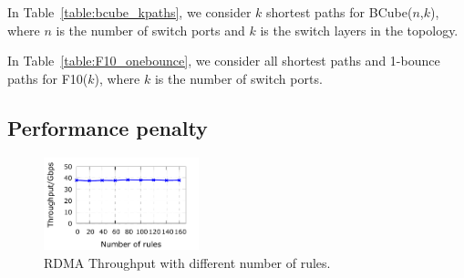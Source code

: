 In Table~\ref{table:bcube_kpaths}, we consider $k$ shortest paths for BCube($n$,$k$), where $n$ is the number of switch ports and $k$ is the switch layers in the topology.

\begin{table}[t]
	\centering
	\caption{F10 with shortest paths and 1-bounce paths.}
	\label{table:F10_onebounce}
\end{table}

In Table~\ref{table:F10_onebounce}, we consider all shortest paths and 1-bounce paths for F10($k$), where $k$ is the number of switch ports.

\subsection{Performance penalty}\label{subsec:exp_performanceoverhead}

\begin{figure}
	\centering
	\includegraphics[width=0.4\textwidth] {figs/overhead_avgthrpt}
	\caption{RDMA Throughput with different number of rules.}\label{fig:thrpt_overhead}
\end{figure}

